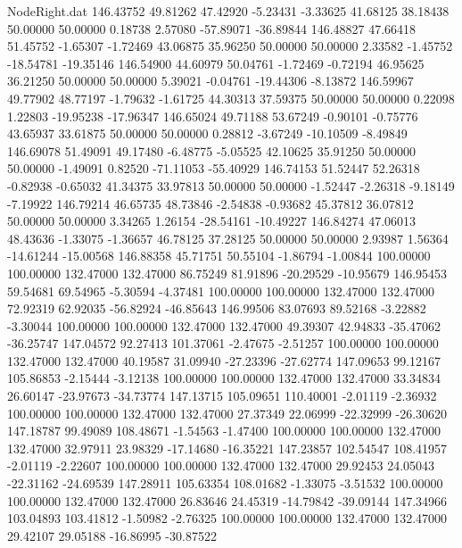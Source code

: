 \begin{filecontents}{NodeRight.dat}
 146.43752   49.81262   47.42920    -5.23431   -3.33625   41.68125   38.18438   50.00000   50.00000    0.18738    2.57080  -57.89071  -36.89844
 146.48827   47.66418   51.45752    -1.65307   -1.72469   43.06875   35.96250   50.00000   50.00000    2.33582   -1.45752  -18.54781  -19.35146
 146.54900   44.60979   50.04761    -1.72469   -0.72194   46.95625   36.21250   50.00000   50.00000    5.39021   -0.04761  -19.44306   -8.13872
 146.59967   49.77902   48.77197    -1.79632   -1.61725   44.30313   37.59375   50.00000   50.00000    0.22098    1.22803  -19.95238  -17.96347
 146.65024   49.71188   53.67249    -0.90101   -0.75776   43.65937   33.61875   50.00000   50.00000    0.28812   -3.67249  -10.10509   -8.49849
 146.69078   51.49091   49.17480    -6.48775   -5.05525   42.10625   35.91250   50.00000   50.00000   -1.49091    0.82520  -71.11053  -55.40929
 146.74153   51.52447   52.26318    -0.82938   -0.65032   41.34375   33.97813   50.00000   50.00000   -1.52447   -2.26318   -9.18149   -7.19922
 146.79214   46.65735   48.73846    -2.54838   -0.93682   45.37812   36.07812   50.00000   50.00000    3.34265    1.26154  -28.54161  -10.49227
 146.84274   47.06013   48.43636    -1.33075   -1.36657   46.78125   37.28125   50.00000   50.00000    2.93987    1.56364  -14.61244  -15.00568
 146.88358   45.71751   50.55104    -1.86794   -1.00844  100.00000  100.00000  132.47000  132.47000   86.75249   81.91896  -20.29529  -10.95679
 146.95453   59.54681   69.54965    -5.30594   -4.37481  100.00000  100.00000  132.47000  132.47000   72.92319   62.92035  -56.82924  -46.85643
 146.99506   83.07693   89.52168    -3.22882   -3.30044  100.00000  100.00000  132.47000  132.47000   49.39307   42.94833  -35.47062  -36.25747
 147.04572   92.27413  101.37061    -2.47675   -2.51257  100.00000  100.00000  132.47000  132.47000   40.19587   31.09940  -27.23396  -27.62774
 147.09653   99.12167  105.86853    -2.15444   -3.12138  100.00000  100.00000  132.47000  132.47000   33.34834   26.60147  -23.97673  -34.73774
 147.13715  105.09651  110.40001    -2.01119   -2.36932  100.00000  100.00000  132.47000  132.47000   27.37349   22.06999  -22.32999  -26.30620
 147.18787   99.49089  108.48671    -1.54563   -1.47400  100.00000  100.00000  132.47000  132.47000   32.97911   23.98329  -17.14680  -16.35221
 147.23857  102.54547  108.41957    -2.01119   -2.22607  100.00000  100.00000  132.47000  132.47000   29.92453   24.05043  -22.31162  -24.69539
 147.28911  105.63354  108.01682    -1.33075   -3.51532  100.00000  100.00000  132.47000  132.47000   26.83646   24.45319  -14.79842  -39.09144
 147.34966  103.04893  103.41812    -1.50982   -2.76325  100.00000  100.00000  132.47000  132.47000   29.42107   29.05188  -16.86995  -30.87522

\end{filecontents}
